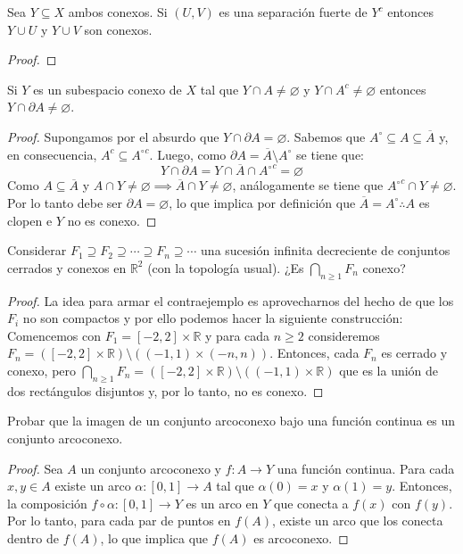 \documentclass{article}
\theoremstyle{definition}
\newcommand{\R}{\mathbb{R}}
\newcommand{\cl}[1]{\overline{#1}}              %
\newcommand{\Int}[1]{{#1}^\circ}                %
\newenvironment{ejercicio}[1]{\begin{trivlist}
\item[\hskip \labelsep {\bfseries Ejercicio}\hskip \labelsep {\bfseries #1.}]}{\end{trivlist}}
\begin{document}
\begin{ejercicio}{C1}
    Sea \(Y \subseteq X\) ambos conexos. Si \((U, V)\) es una separación fuerte de \(Y^c\) entonces \(Y \cup U\) y \(Y \cup V\) son conexos.
\end{ejercicio}
\begin{proof}
\end{proof}

\begin{ejercicio}{C2}
    Si \(Y\) es un subespacio conexo de \(X\) tal que \(Y \cap A \neq \varnothing \) y \(Y \cap A^c \neq \varnothing \) entonces \(Y \cap \partial A \neq \varnothing \).
\end{ejercicio}
\begin{proof}
    Supongamos por el absurdo que \( Y \cap \partial A = \varnothing \). Sabemos que \( \Int{A} \subseteq A \subseteq \cl{A} \) y, en consecuencia, \( A^c \subseteq {\Int{A}}^c \).
    Luego, como \( \partial A = \cl{A} \setminus \Int{A} \) se tiene que: \[
        Y \cap \partial A = Y \cap \cl{A} \cap {\Int{A}}^c = \varnothing
    \]
    Como \( A \subseteq \cl{A} \) y \( A \cap Y \neq \varnothing \implies \cl{A} \cap Y \neq \varnothing \), análogamente se tiene que \( {\Int{A}}^c \cap Y \neq \varnothing \). Por lo tanto
    debe ser \( \partial A = \varnothing \), lo que implica por definición que \( \cl{A} = \Int{A} \therefore A \) es clopen e \( Y \) no es conexo.
\end{proof}

\begin{ejercicio}{C3}
    Considerar \(F_1 \supseteq F_2 \supseteq \cdots \supseteq F_n \supseteq \cdots \) una sucesión infinita decreciente de conjuntos cerrados y conexos en \(\R^2\) (con la topología usual). ¿Es \(\bigcap_{n \geq 1} F_n\) conexo?
\end{ejercicio}
\begin{proof}
    La idea para armar el contraejemplo es aprovecharnos del hecho de que los \( F_i \) no son compactos y por ello podemos hacer la siguiente construcción: Comencemos con
    \( F_1 = [-2, 2] \times \R \) y para cada \( n \geq 2 \) consideremos \( F_n = ([-2, 2] \times \R) \setminus ((-1, 1) \times (-n, n)) \). Entonces, cada \( F_n \) es cerrado y
    conexo, pero \( \bigcap_{n \geq 1} F_n = ([-2, 2] \times \R) \setminus ((-1, 1) \times \R) \) que es la unión de dos rectángulos disjuntos y, por lo tanto, no es conexo.
\end{proof}

\begin{ejercicio}{C4}
    Probar que la imagen de un conjunto arcoconexo bajo una función continua es un conjunto arcoconexo.
\end{ejercicio}
\begin{proof}
    Sea \( A \) un conjunto arcoconexo y \( f : A \to Y \) una función continua. Para cada \( x, y \in A \) existe un arco \( \alpha : [0, 1] \to A \) tal que \( \alpha(0) = x \) y \( \alpha(1) = y \).
    Entonces, la composición \( f \circ \alpha : [0, 1] \to Y \) es un arco en \( Y \) que conecta a \( f(x) \) con \( f(y) \). Por lo tanto, para cada par de puntos en \( f(A) \), existe un arco que los conecta dentro de \( f(A) \), lo que implica que \( f(A) \) es arcoconexo.  \end{proof}
\end{document}
